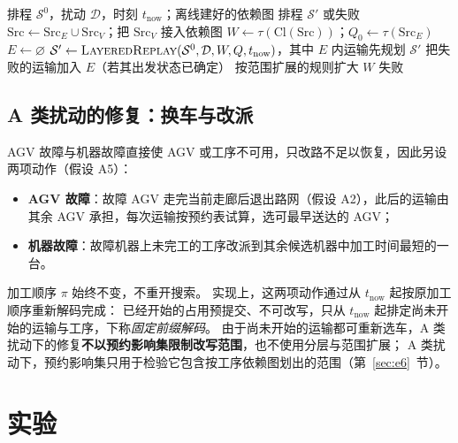 \documentclass[manuscript,screen,review]{acmart}
\begin{document}
\begin{algorithm}[t]
\caption{分层有界修复（划界 + 分层回放 + 失败后放宽）}
\label{alg:strc_repair}
\begin{algorithmic}[1]
\Require 排程 \(\mathcal{S}^0\)，扰动 \(\mathcal{D}\)，时刻 \(t_{\mathrm{now}}\)；离线建好的依赖图
\Ensure 排程 \(\mathcal{S}'\) 或失败
\State \(\mathrm{Src}\gets\mathrm{Src}_E\cup\mathrm{Src}_V\)；把 \(\mathrm{Src}_V\) 接入依赖图
\State \(W \gets \tau(\mathrm{Cl}(\mathrm{Src}))\)；\(Q_0\gets\tau(\mathrm{Src}_E)\)
   
    \State \(E\gets\varnothing\)
    \Repeat
      \State \(\mathcal{S}' \gets \textsc{LayeredReplay}(\mathcal{S}^0,\mathcal{D},W,Q,t_{\mathrm{now}})\)，其中 \(E\) 内运输先规划
        \State \Return \(\mathcal{S}'\)
      \EndIf
      \State 把失败的运输加入 \(E\)（若其出发状态已确定）
  \EndFor
  \State 按范围扩展的规则扩大 \(W\) 
\EndFor
\State \Return 失败
\end{algorithmic}
\end{algorithm}

\subsection{A 类扰动的修复：换车与改派}
\label{sec:afault}

AGV 故障与机器故障直接使 AGV 或工序不可用，只改路不足以恢复，因此另设两项动作（假设 A5）：
\begin{itemize}[leftmargin=1.5em,itemsep=0.15em]
\item \textbf{AGV 故障}：故障 AGV 走完当前走廊后退出路网（假设 A2），此后的运输由其余 AGV 承担，每次运输按预约表试算，选可最早送达的 AGV；
\item \textbf{机器故障}：故障机器上未完工的工序改派到其余候选机器中加工时间最短的一台。
\end{itemize}
加工顺序 \(\pi\) 始终不变，不重开搜索。
实现上，这两项动作通过从 \(t_{\mathrm{now}}\) 起按原加工顺序重新解码完成：
已经开始的占用预提交、不可改写，只从 \(t_{\mathrm{now}}\) 起排定尚未开始的运输与工序，下称\emph{固定前缀解码}。
由于尚未开始的运输都可重新选车，A 类扰动下的修复\textbf{不以预约影响集限制改写范围}，也不使用分层与范围扩展；
A 类扰动下，预约影响集只用于检验它包含按工序依赖图划出的范围（第~\ref{sec:e6}~节）。


\section{实验}
\label{sec:experiments}
\end{document}
